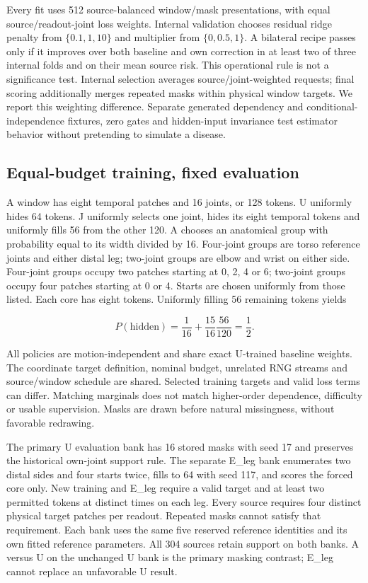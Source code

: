 \documentclass[letterpaper]{article}
\begin{document}
Every fit uses 512 source-balanced window/mask presentations, with equal source/readout-joint loss weights. Internal validation chooses residual ridge penalty from \(\{0.1,1,10\}\) and multiplier from \(\{0,0.5,1\}\). A bilateral recipe passes only if it improves over both baseline and own correction in at least two of three internal folds and on their mean source risk. This operational rule is not a significance test. Internal selection averages source/joint-weighted requests; final scoring additionally merges repeated masks within physical window targets. We report this weighting difference. Separate generated dependency and conditional-independence fixtures, zero gates and hidden-input invariance test estimator behavior without pretending to simulate a disease.

\subsection{Equal-budget training, fixed evaluation}

A window has eight temporal patches and 16 joints, or 128 tokens. U uniformly hides 64 tokens. J uniformly selects one joint, hides its eight temporal tokens and uniformly fills 56 from the other 120. A chooses an anatomical group with probability equal to its width divided by 16. Four-joint groups are torso reference joints and either distal leg; two-joint groups are elbow and wrist on either side. Four-joint groups occupy two patches starting at 0, 2, 4 or 6; two-joint groups occupy four patches starting at 0 or 4. Starts are chosen uniformly from those listed. Each core has eight tokens. Uniformly filling 56 remaining tokens yields

\begin{equation}
P(\text{hidden})=\frac{1}{16}+\frac{15}{16}\frac{56}{120}=\frac12.
\end{equation}

All policies are motion-independent and share exact U-trained baseline weights. The coordinate target definition, nominal budget, unrelated RNG streams and source/window schedule are shared. Selected training targets and valid loss terms can differ. Matching marginals does not match higher-order dependence, difficulty or usable supervision. Masks are drawn before natural missingness, without favorable redrawing.

The primary U evaluation bank has 16 stored masks with seed 17 and preserves the historical own-joint support rule. The separate E\_leg bank enumerates two distal sides and four starts twice, fills to 64 with seed 117, and scores the forced core only. New training and E\_leg require a valid target and at least two permitted tokens at distinct times on each leg. Every source requires four distinct physical target patches per readout. Repeated masks cannot satisfy that requirement. Each bank uses the same five reserved reference identities and its own fitted reference parameters. All 304 sources retain support on both banks. A versus U on the unchanged U bank is the primary masking contrast; E\_leg cannot replace an unfavorable U result.
\end{document}
